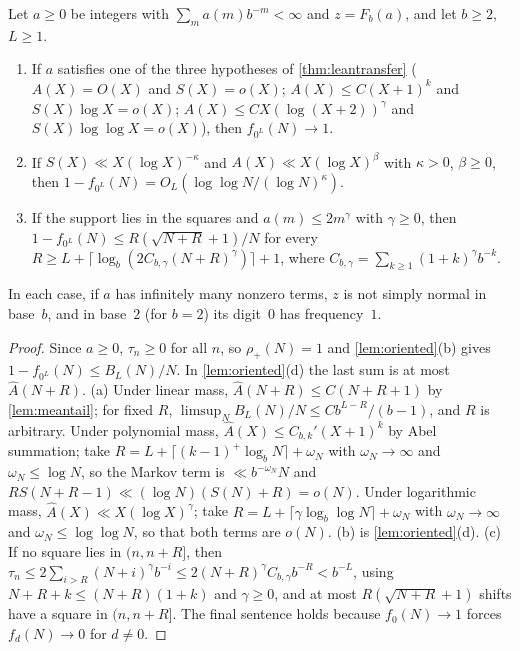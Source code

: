 \documentclass[11pt]{article}
\newcommand{\Ahat}{\widehat A}
\newcommand{\LL}{\log\log N}
\begin{document}
\begin{theorem}\label{thm:nonneg}
Let $a\ge0$ be integers with $\sum_ma(m)b^{-m}<\infty$ and $z=F_b(a)$, and let $b\ge2$, $L\ge1$.
\begin{enumerate}[label=\textup{(\alph*)},nosep]
\item If $a$ satisfies one of the three hypotheses of \cref{thm:leantransfer}
\textup{(}$A(X)=O(X)$ and $S(X)=o(X)$; $A(X)\le C(X+1)^k$ and $S(X)\log X=o(X)$;
$A(X)\le CX(\log(X+2))^\gamma$ and $S(X)\log\log X=o(X)$\textup{)}, then $f_{0^L}(N)\to1$.
\item If $S(X)\ll X(\log X)^{-\kappa}$ and $A(X)\ll X(\log X)^\beta$ with $\kappa>0$, $\beta\ge0$,
then $1-f_{0^L}(N)=O_L(\LL/(\log N)^\kappa)$.
\item If the support lies in the squares and $a(m)\le2m^\gamma$ with $\gamma\ge0$, then
$1-f_{0^L}(N)\le R(\sqrt{N+R}+1)/N$ for every
$R\ge L+\lceil\log_b(2C_{b,\gamma}(N+R)^\gamma)\rceil+1$, where
$C_{b,\gamma}=\sum_{k\ge1}(1+k)^\gamma b^{-k}$.
\end{enumerate}
In each case, if $a$ has infinitely many nonzero terms, $z$ is not simply normal in base~$b$,
and in base~$2$ (for $b=2$) its digit~$0$ has frequency~$1$.
\end{theorem}

\begin{proof}
Since $a\ge0$, $\tau_n\ge0$ for all $n$, so $\rho_+(N)=1$ and \cref{lem:oriented}(b) gives
$1-f_{0^L}(N)\le B_L(N)/N$. In \cref{lem:oriented}(d) the last sum is at most $\Ahat(N+R)$.
(a) Under linear mass, $\Ahat(N+R)\le C(N+R+1)$ by \cref{lem:meantail}; for fixed $R$,
$\limsup_NB_L(N)/N\le Cb^{L-R}/(b-1)$, and $R$ is arbitrary. Under polynomial mass,
$\Ahat(X)\le C_{b,k}'(X+1)^k$ by Abel summation; take
$R=L+\lceil(k-1)^+\log_bN\rceil+\omega_N$ with $\omega_N\to\infty$ and $\omega_N\le\log N$, so
the Markov term is $\ll b^{-\omega_N}N$ and $RS(N+R-1)\ll(\log N)(S(N)+R)=o(N)$. Under
logarithmic mass, $\Ahat(X)\ll X(\log X)^\gamma$; take
$R=L+\lceil\gamma\log_b\log N\rceil+\omega_N$ with $\omega_N\to\infty$ and
$\omega_N\le\log\log N$, so that both terms are $o(N)$. (b) is \cref{lem:oriented}(d). (c) If no
square lies in $(n,n+R]$, then
$\tau_n\le2\sum_{i>R}(N+i)^\gamma b^{-i}\le2(N+R)^\gamma C_{b,\gamma}b^{-R}<b^{-L}$, using
$N+R+k\le(N+R)(1+k)$ and $\gamma\ge0$, and at most $R(\sqrt{N+R}+1)$ shifts have a square in
$(n,n+R]$. The final sentence holds because $f_0(N)\to1$ forces $f_d(N)\to0$ for $d\ne0$.
\end{proof}
\end{document}
